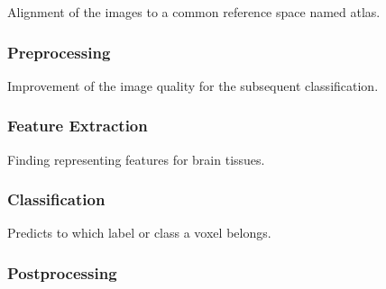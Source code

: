 \documentclass[journal]{IEEEtran}
\begin{document}
Alignment of the images to a common reference space named atlas.

\subsubsection{Preprocessing}

Improvement of the image quality for the subsequent classification.

\subsubsection{Feature Extraction}

Finding representing features for brain tissues.

\subsubsection{Classification}

Predicts to which label or class a voxel belongs.

\subsubsection{Postprocessing}
\end{document}
